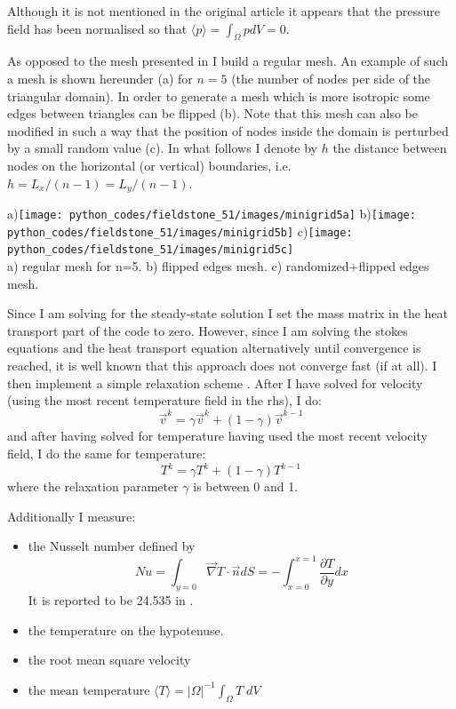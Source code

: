 Although it is not mentioned in the original article it appears that the 
pressure field has been normalised so that $\langle p \rangle = \int_\Omega p dV=0$.

As opposed to the mesh presented in \cite{jolm17} I build a regular mesh.
An example of such a mesh is shown hereunder (a) for $n=5$ (the number of nodes
per side of the triangular domain). 
In order to generate a mesh which is more isotropic some edges between 
triangles can be flipped (b). 
Note that this mesh can also be modified in such a way that the position of 
nodes inside the domain is perturbed by a small random value (c).
In what follows I denote by $h$ the distance between nodes
on the horizontal (or vertical) boundaries, i.e. $h=L_x/(n-1)=L_y/(n-1)$.
\begin{center}
a)\texttt{[image: python\_codes/fieldstone\_51/images/minigrid5a]}
b)\texttt{[image: python\_codes/fieldstone\_51/images/minigrid5b]}
c)\texttt{[image: python\_codes/fieldstone\_51/images/minigrid5c]}\\
{\small a) regular mesh for n=5. b) flipped edges mesh. c) randomized+flipped edges mesh.}
\end{center}

Since I am solving for the steady-state solution I set the mass matrix in the 
heat transport part of the code to zero. However, since I am solving the stokes equations
and the heat transport equation alternatively until convergence is reached, it is well 
known that this approach does not converge fast (if at all). 
I then implement a simple relaxation scheme \cite{vyrc13}. After I have solved for velocity (using the 
most recent temperature field in the rhs), I do:
\[
\vec{v}^k = \gamma \vec{v}^k + (1-\gamma) \vec{v}^{k-1}
\]
and after having solved for temperature having used the most recent velocity field, 
I do the same for temperature:
\[
{T}^k = \gamma {T}^k + (1-\gamma) {T}^{k-1}
\]
where the relaxation parameter $\gamma$ is between 0 and 1.




Additionally I measure:
\begin{itemize}
\item the Nusselt number defined by 
\[
Nu
=\int_{y=0} \vec{\nabla}T \cdot \vec{n} dS  
=-\int_{x=0}^{x=1} \frac{\partial T}{\partial y} dx 
\]
It is reported to be 24.535 in \cite{jolm17}.
\item the temperature on the hypotenuse.
\item the root mean square velocity
\item the mean temperature $\langle T \rangle = |\Omega|^{-1} \int_\Omega T \; dV$
\end{itemize}

